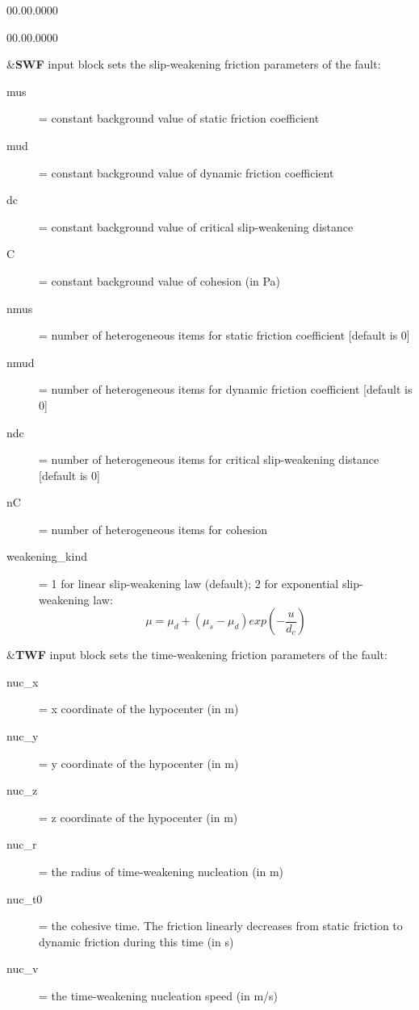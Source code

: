 \begin{lyxlist}{00.00.0000}
\begin{lyxlist}{00.00.0000}
\item [{\&\textbf{SWF}}] input block sets the slip-weakening friction parameters
of the fault:
\begin{description}
\item [{mus}] = constant background value of static friction coefficient
\item [{mud}] = constant background value of dynamic friction coefficient
\item [{dc}] = constant background value of critical slip-weakening distance
\item [{C}] = constant background value of cohesion (in Pa)
\item [{nmus}] = number of heterogeneous items for static friction coefficient
{[}default is 0{]}
\item [{nmud}] = number of heterogeneous items for dynamic friction coefficient
{[}default is 0{]}
\item [{ndc}] = number of heterogeneous items for critical slip-weakening
distance {[}default is 0{]}
\item [{nC}] = number of heterogeneous items for cohesion
\item [{weakening\_kind}] = 1 for linear slip-weakening law (default); 2 for exponential slip-weakening law:
                            $$\mu = \mu_d + (\mu_s-\mu_d) exp(-\frac{u}{d_c}) $$
\end{description}

\item [{\&\textbf{TWF}}] input block sets the time-weakening friction parameters
of the fault:
\begin{description}
\item [{nuc\_x}]  = x coordinate of the hypocenter (in m)
\item [{nuc\_y}]  = y coordinate of the hypocenter (in m)
\item [{nuc\_z}]  = z coordinate of the hypocenter (in m)
\item [{nuc\_r}]  = the radius of time-weakening nucleation (in m)
\item [{nuc\_t0}] = the cohesive time. The friction linearly decreases from static friction to dynamic friction during this time (in s)
\item [{nuc\_v}]  = the time-weakening nucleation speed (in m/s)
\end{description}


\end{lyxlist}
\end{lyxlist}
